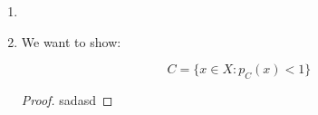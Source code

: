 \documentclass[a4paper]{article}
\renewcommand{\hline}{\noindent\makebox[\linewidth]{\rule{12cm}{1pt}}}
\begin{document}
\begin{enumerate}[label=(\roman*)]
    	\begin{issue}{}{}
    		For any $x \in X$ and $\lambda \in \mathbb R_{>0}$ it holds
    		\[
    			p_C(\lambda x) = \lambda p_C(x).
    		\]
    	\end{issue}
    	
    	\begin{proof}
    	Let $x \in X$ and $\lambda > 0$. Then,
    	\begin{align*}
    		p_C(\lambda x) = \inf \{ \alpha > 0 : \lambda x \in \alpha  C \} &= \inf \{ \alpha > 0 : x \in \frac{\alpha}{\lambda}  C \} \\
    		&= \inf \{ \lambda \alpha > 0 : x \in \alpha  C \} \\
    		&= \lambda \inf \{ \alpha > 0 : x \in \alpha  C \} \\
    		&= \lambda p_C(x).
    	\end{align*}
    	\end{proof}
   
   		\hline
    	
    	\textbf{Conclusion:} $p_C: X \to [0,\infty)$ is a sublinear functional.
    
    \item 
    
    \item We want to show:
    \begin{issue}{}{}
        \[
            C = \{ x \in X : p_C(x) < 1 \}
        \]
    \end{issue}
    
    \begin{proof}
    	sadasd
    \end{proof}
    
   
\end{enumerate}
\end{document}
